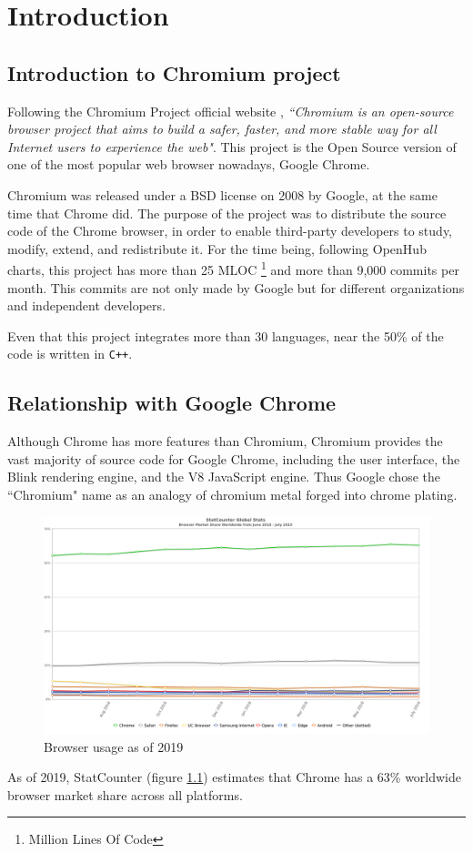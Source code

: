 \chapter{Introduction}

\section{Introduction to Chromium project}
Following the Chromium Project official website \cite{chromium}, \textit{``Chromium is an open-source browser project that aims to build a safer, faster, and more stable way for all Internet users to experience the web"}. This project is the Open Source version of one of the most popular web browser nowadays, Google Chrome.

Chromium was released under a BSD license on 2008 \cite{release} by Google, at the same time that Chrome did. The purpose of the project was to distribute the source code of the Chrome browser, in order to enable third-party developers to study, modify, extend, and redistribute it. For the time being, following OpenHub charts, this project has more than 25 MLOC \footnote{Million Lines Of Code} and more than 9,000 commits per month. This commits are not only made by Google but for different organizations and independent developers. 

Even that this project integrates more than 30 languages, near the 50\% of the code is written in \texttt{C++}.


\section{Relationship with Google Chrome}

Although Chrome has more features than Chromium, Chromium provides the vast majority of source code for Google Chrome, including the user interface, the Blink rendering engine, and the V8 JavaScript engine. Thus Google chose the ``Chromium" name as an analogy of chromium metal forged into chrome plating.
\begin{figure}[H]
    \centering
    \includegraphics[width=\textwidth]{img/compare.png}
    \caption{Browser usage as of 2019}
    \label{fig:usage}
\end{figure}
As of 2019, StatCounter \cite{usage} (figure \ref{fig:usage}) estimates that Chrome has a 63\% worldwide browser market share across all platforms.


